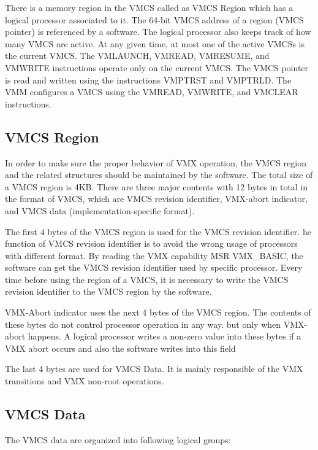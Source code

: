 \documentclass[onecolumn, draftclsnofoot,10pt, compsoc]{IEEEtran}
\begin{document}
There is a memory region in the VMCS called as VMCS Region which has a logical processor associated to it. The 64-bit VMCS address of a region (VMCS pointer) is referenced by a software. The logical processor also keeps track of how many VMCS are active.  At any given time, at most one of the active VMCSs is the current VMCS. The VMLAUNCH, VMREAD, VMRESUME, and VMWRITE instructions operate only on the current VMCS. The VMCS pointer is read and written using the instructions VMPTRST and VMPTRLD. The VMM configures a VMCS using the VMREAD, VMWRITE, and VMCLEAR instructions. 


\subsection{VMCS Region}
In order to make sure the proper behavior of VMX operation, the VMCS region and the related structures should be maintained by the software.  The total size of a VMCS region is 4KB. There are three major contents with 12 bytes in total in the format of VMCS, which are VMCS revision identifier, VMX-abort indicator, and VMCS data (implementation-specific format). 

The first 4 bytes of the VMCS region is used for the VMCS revision identifier. he function of VMCS revision identifier is to avoid the wrong usage of processors with different format. By reading the VMX capability MSR VMX\_BASIC, the software can get the VMCS revision identifier used by specific processor. Every time before using the region of a VMCS, it is necessary to write the VMCS revision identifier to the VMCS region by the software.

VMX-Abort indicator uses the next 4 bytes of the VMCS region. The contents of these bytes do not control processor operation in any way. but only when VMX-abort happens. A logical processor writes a non-zero value into these bytes if a VMX abort occurs and also the software writes into this field

The last 4 bytes are used for VMCS Data. It is mainly responsible of the VMX transitions and VMX non-root operations. 

\subsection{VMCS Data}
    The VMCS data are organized into following logical groups:
\end{document}
